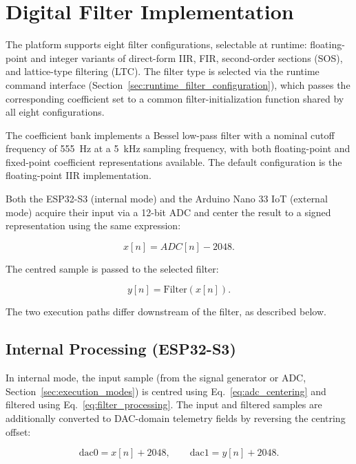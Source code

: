 \section{Digital Filter Implementation}
\label{sec:digital_filter}

The platform supports eight filter configurations, selectable at runtime:
floating-point and integer variants of direct-form IIR, FIR, second-order
sections (SOS), and lattice-type filtering (LTC). The filter type is selected
via the runtime command interface
(Section~\ref{sec:runtime_filter_configuration}), which passes the
corresponding coefficient set to a common filter-initialization function shared
by all eight configurations.

The coefficient bank implements a Bessel low-pass filter with a nominal cutoff
frequency of 555~Hz at a 5~kHz sampling frequency, with both floating-point and
fixed-point coefficient representations available. The default configuration is
the floating-point IIR implementation.

Both the ESP32-S3 (internal mode) and the Arduino Nano 33 IoT (external mode)
acquire their input via a 12-bit ADC and center the result to a signed
representation using the same expression:

\begin{equation}
    x[n] = ADC[n] - 2048.
    \label{eq:adc_centering}
\end{equation}

The centred sample is passed to the selected filter:

\begin{equation}
    y[n] = \mathrm{Filter}\left(x[n]\right).
    \label{eq:filter_processing}
\end{equation}

The two execution paths differ downstream of the filter, as described below.

\subsection{Internal Processing (ESP32-S3)}
\label{sec:esp32_internal_processing}

In internal mode, the input sample (from the signal generator or ADC,
Section~\ref{sec:execution_modes}) is centred using Eq.~\ref{eq:adc_centering}
and filtered using Eq.~\ref{eq:filter_processing}. The input and filtered
samples are additionally converted to DAC-domain telemetry fields by reversing
the centring offset:

\begin{equation}
    \text{dac0} = x[n] + 2048, \qquad \text{dac1} = y[n] + 2048.
    \label{eq:internal_dac_domain}
\end{equation}

